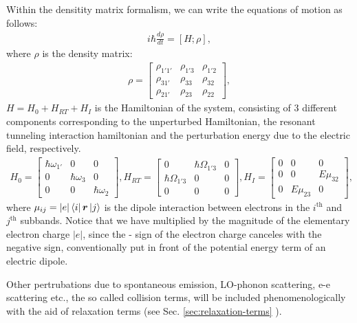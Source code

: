 \documentclass[10pt,english,fleqn]{article}%
\newcommand{\mb}[1]{\bm{#1}}
\begin{document}
Within the densitity matrix formalism, we can write the equations of motion as follows:
\begin{align}
 \label{eq:luiville-eqn}
 i\hbar \frac{d \rho}{dt} = [H;\rho] ,
\end{align}
where $\rho$ is the density matrix: 
\begin{align}
 \label{eq:dmatrix-define}
\rho = \begin{bmatrix}
\rho_{1'1'}& \rho_{1'3} & \rho_{1'2} \\
\rho_{31'} & \rho_{33} & \rho_{32} \\
\rho_{21'} & \rho_{23} & \rho_{22}
\end{bmatrix} , 
\end{align}
$H = H_0 + H_{RT} + H_I$ is the Hamiltonian of the system, consisting of 3 different components corresponding to the unperturbed Hamiltonian,
the resonant tunneling interaction hamiltonian and the perturbation energy due to the electric field, respectively. 
\begin{align}
 \label{eq:hamiltonians}
H_0 = 
\begin{bmatrix}
\hbar\omega_{1'} & 0 & 0 \\
0  & \hbar\omega_{3} &  0 \\
0  & 0  & \hbar\omega_{2}   
\end{bmatrix} , 
H_{RT} = \begin{bmatrix}
0  & \hbar\Omega_{1'3}  &  0 \\
\hbar\Omega_{1'3}  & 0  & 0 \\
0  & 0  & 0    
\end{bmatrix} , 
H_{I} =  \begin{bmatrix}
0  & 0  &  0 \\
0 &  0  & E\mu_{32} \\
0  & E\mu_{23} &  0     
\end{bmatrix}, 
\end{align}
where $\mu_{ij} = |e|\Bra{i} \mb{r} \ket{j}$ is the dipole interaction between electrons in the $i^{\text{th}}$ and  $j^{\text{th}}$ subbands. Notice that we 
have multiplied by the magnitude of the elementary electron charge $|e|$, since the - sign of the electron charge canceles with the negative sign, conventionally
put in front of the potential energy term of an electric dipole. 

Other pertrubations due to spontaneous emission, LO-phonon scattering, e-e scattering etc., the so called collision terms, will be included phenomenologically with the aid of relaxation terms 
(see Sec. \ref{sec:relaxation-terms} ). 
\end{document}
